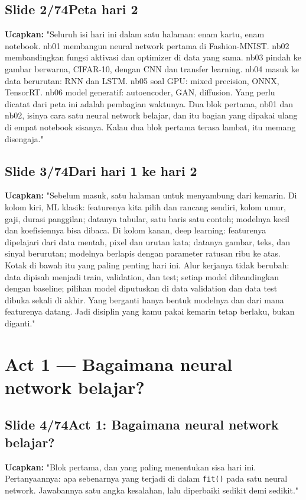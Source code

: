 \documentclass[11pt]{article}
\renewcommand{\framebox}[1]{\colorbox{acc!15}{\textcolor{acc}{\textbf{#1}}}}
\begin{document}
\subsection*{\framebox{Slide 2/74}\quad Peta hari 2}
\textbf{Ucapkan:} "Seluruh isi hari ini dalam satu halaman: enam kartu, enam notebook. nb01 membangun neural network pertama di Fashion-MNIST. nb02 membandingkan fungsi aktivasi dan optimizer di data yang sama. nb03 pindah ke gambar berwarna, CIFAR-10, dengan CNN dan transfer learning. nb04 masuk ke data berurutan: RNN dan LSTM. nb05 soal GPU: mixed precision, ONNX, TensorRT. nb06 model generatif: autoencoder, GAN, diffusion. Yang perlu dicatat dari peta ini adalah pembagian waktunya. Dua blok pertama, nb01 dan nb02, isinya cara satu neural network belajar, dan itu bagian yang dipakai ulang di empat notebook sisanya. Kalau dua blok pertama terasa lambat, itu memang disengaja."\\[2pt]

\subsection*{\framebox{Slide 3/74}\quad Dari hari 1 ke hari 2}
\textbf{Ucapkan:} "Sebelum masuk, satu halaman untuk menyambung dari kemarin. Di kolom kiri, ML klasik: featurenya kita pilih dan rancang sendiri, kolom umur, gaji, durasi panggilan; datanya tabular, satu baris satu contoh; modelnya kecil dan koefisiennya bisa dibaca. Di kolom kanan, deep learning: featurenya dipelajari dari data mentah, pixel dan urutan kata; datanya gambar, teks, dan sinyal berurutan; modelnya berlapis dengan parameter ratusan ribu ke atas. Kotak di bawah itu yang paling penting hari ini. Alur kerjanya tidak berubah: data dipisah menjadi train, validation, dan test; setiap model dibandingkan dengan baseline; pilihan model diputuskan di data validation dan data test dibuka sekali di akhir. Yang berganti hanya bentuk modelnya dan dari mana featurenya datang. Jadi disiplin yang kamu pakai kemarin tetap berlaku, bukan diganti."\\[2pt]

\section{Act 1 — Bagaimana neural network belajar?}

\subsection*{\framebox{Slide 4/74}\quad Act 1: Bagaimana neural network belajar?}
\textbf{Ucapkan:} "Blok pertama, dan yang paling menentukan sisa hari ini. Pertanyaannya: apa sebenarnya yang terjadi di dalam \texttt{fit()} pada satu neural network. Jawabannya satu angka kesalahan, lalu diperbaiki sedikit demi sedikit."\\[2pt]
\end{document}
